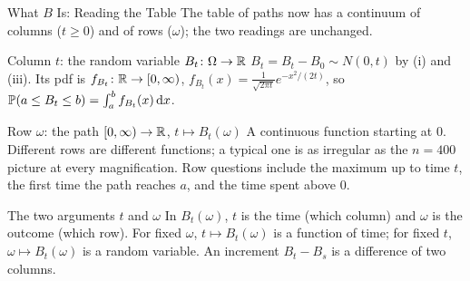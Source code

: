 \begin{frame}{What $B$ Is: Reading the Table}
  \label{fr:bmreading}
  \small
  The table of paths now has a continuum of columns ($t\ge0$) and of rows ($\omega$); the two readings are unchanged.
  \begin{block}{Column $t$: the random variable $B_t\colon\Omega\to\mathbb{R}$}
    $B_t=B_t-B_0\sim N(0,t)$ by (i) and (iii). Its pdf is $f_{B_t}\colon\mathbb{R}\to[0,\infty)$, $f_{B_t}(x)=\frac1{\sqrt{2\pi t}}e^{-x^2/(2t)}$, so $\mathbb{P}(a\le B_t\le b)=\int_a^b f_{B_t}(x)\,\mathrm{d} x$.
  \end{block}
  \begin{block}{Row $\omega$: the path $[0,\infty)\to\mathbb{R}$, $t\mapsto B_t(\omega)$}
    A continuous function starting at $0$. Different rows are different functions; a typical one is as irregular as the $n=400$ picture at every magnification. Row questions include the maximum up to time $t$, the first time the path reaches $a$, and the time spent above $0$.
  \end{block}
  \begin{block}{The two arguments $t$ and $\omega$}
    In $B_t(\omega)$, $t$ is the time (which column) and $\omega$ is the outcome (which row). For fixed $\omega$, $t\mapsto B_t(\omega)$ is a function of time; for fixed $t$, $\omega\mapsto B_t(\omega)$ is a random variable. An increment $B_t-B_s$ is a difference of two columns.
  \end{block}
\end{frame}

